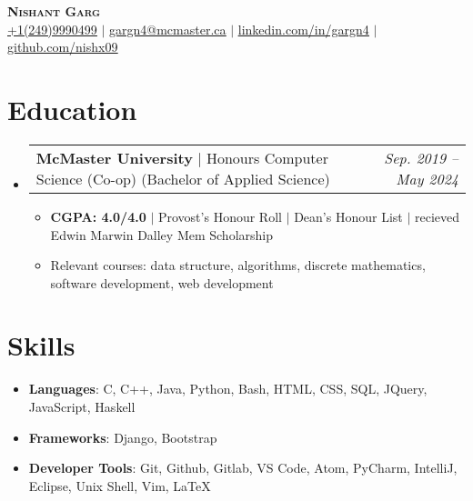 \documentclass[letterpaper,11pt]{article}
\makeatletter
\newcommand{\resumeItem}[1]{
  \item\small{
    {#1 \vspace{-2pt}}
  }
}
\newcommand{\resumeSubheading}[2]{
  \vspace{-2pt}\item
    \begin{tabular*}{0.97\textwidth}[t]{l@{\extracolsep{\fill}}r}
      #1 & #2 \\
    \end{tabular*}\vspace{-7pt}
}
\newcommand{\resumeSubHeadingListStart}{\begin{itemize}[leftmargin=0.15in, label={}]}
\newcommand{\resumeSubHeadingListEnd}{\end{itemize}}
\newcommand{\resumeItemListStart}{\begin{itemize}}
\newcommand{\resumeItemListEnd}{\end{itemize}\vspace{-5pt}}
\makeatother
\begin{document}
\begin{center}
    \textbf{\Huge \scshape Nishant Garg} \\ \vspace{1pt}
    \small \href{tel:12499990499}{\underline{+1(249)9990499}} $|$
    \href{mailto:gargn4@mcmaster.ca}{\underline{gargn4@mcmaster.ca}} $|$ 
    \href{https://www.linkedin.com/in/gargn4}{\underline{linkedin.com/in/gargn4}} $|$
    \href{https://github.com/nishx09}{\underline{github.com/nishx09}}
\end{center}

\section{Education}
  \resumeSubHeadingListStart
    \resumeSubheading
      {\textbf{McMaster University} $|$ \small Honours Computer Science (Co-op) (Bachelor of Applied Science) }{\textit{\small Sep. 2019 -- May 2024}}
      {}{}
      \resumeItemListStart
        \resumeItem{\textbf{CGPA: 4.0/4.0} $|$ Provost's Honour Roll $|$ Dean's Honour List $|$ recieved Edwin Marwin Dalley Mem Scholarship}
        \resumeItem{Relevant courses: data structure, algorithms, discrete mathematics, software development, web development}
    \resumeItemListEnd
  \resumeSubHeadingListEnd

\section{Skills}
 \begin{itemize}[leftmargin=0.15in, label={}]
    \small \item \textbf{Languages}{: \small  C, C++, Java, Python, Bash, HTML, CSS, SQL, JQuery, JavaScript, Haskell} \\
    \vspace{0.0001cm}
    \small \item \textbf{Frameworks}{: Django, Bootstrap} \\
    \vspace{0.0001cm}
    \small \item \textbf{Developer Tools}{: Git, Github, Gitlab, VS Code, Atom, PyCharm, IntelliJ, Eclipse, Unix Shell, Vim, \LaTeX} \\
    
 \end{itemize}

\end{document}
